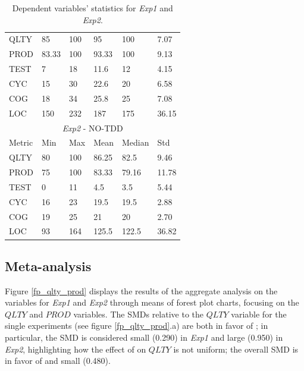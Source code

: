 \begin{table}[H]
\begin{center}
\begin{tabular}{ |p{2cm}||p{1.6cm}|p{1.6cm}|p{1.6cm}|p{1.6cm}|p{1.6cm}|}
            \hline
                QLTY & 85 & 100 & 95 & 100 & 7.07 \\
                PROD & 83.33 & 100 & 93.33 & 100 & 9.13 \\
                TEST & 7 & 18 & 11.6 & 12 & 4.15 \\
                CYC & 15 & 30 & 22.6 & 20 & 6.58 \\
                COG & 18 & 34 & 25.8 & 25 & 7.08 \\
                LOC & 150 & 232 & 187 & 175 & 36.15 \\
            \hline\hline
                \multicolumn{6}{|c|}{\textit{Exp2} - NO-TDD} \\
            \hline
                Metric & Min & Max & Mean & Median & Std\\
            \hline
                QLTY & 80 & 100 & 86.25 & 82.5 & 9.46 \\
                PROD & 75 & 100 & 83.33 & 79.16 & 11.78 \\
                TEST & 0 & 11 & 4.5 & 3.5 & 5.44 \\
                CYC & 16 & 23 & 19.5 & 19.5 & 2.88 \\
                COG & 19 & 25 & 21 & 20 & 2.70 \\
                LOC & 93 & 164 & 125.5 & 122.5 & 36.82 \\
            \hline
        \end{tabular}
        \caption{\label{tab_dv_t1_2}Dependent variables' statistics for \textit{Exp1} and \textit{Exp2}.}
    \end{center}
\end{table}



\subsection{Meta-analysis}
Figure \ref{fp_qlty_prod} displays the results of the aggregate analysis on the variables for \textit{Exp1} and \textit{Exp2} through means of forest plot charts, focusing on the $QLTY$ and $PROD$ variables.
The SMDs relative to the $QLTY$ variable for the single experiments (see figure \ref{fp_qlty_prod}.a) are both in favor of \tdd; in particular, the SMD is considered small (0.290) in \textit{Exp1} and large (0.950) in \textit{Exp2}, highlighting how the effect of \tdd on $QLTY$ is not uniform; the overall SMD is in favor of \tdd and small (0.480).

